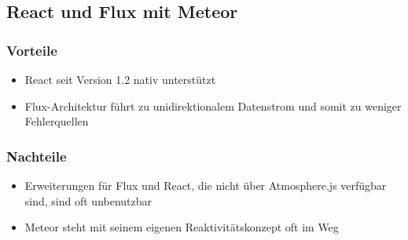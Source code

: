 \subsection{React und Flux mit Meteor}
\label{ssec:el-react-und-flux-mit-meteor}

\subsubsection{Vorteile}
\label{sssec:elf-vorteile}

\begin{itemize}
	\item React seit Version 1.2 nativ unterstützt
	\item Flux-Architektur führt zu unidirektionalem Datenstrom und somit zu
		weniger Fehlerquellen
\end{itemize}

\subsubsection{Nachteile}
\label{sssec:elf-nachteile}

\begin{itemize}
	\item Erweiterungen für Flux und React, die nicht über Atmosphere.js
		verfügbar sind, sind oft unbenutzbar
	\item Meteor steht mit seinem eigenen Reaktivitätskonzept oft im Weg
\end{itemize}
